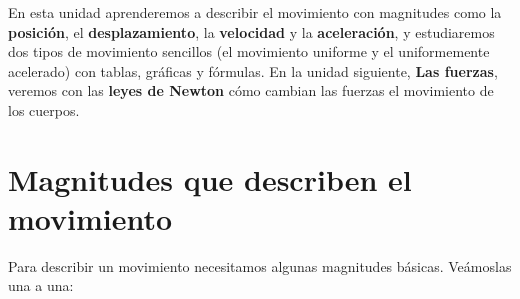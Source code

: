 En esta unidad aprenderemos a describir el movimiento con magnitudes como la \textbf{posición}, el \textbf{desplazamiento}, la \textbf{velocidad} y la \textbf{aceleración}, y estudiaremos dos tipos de movimiento sencillos (el movimiento uniforme y el uniformemente acelerado) con tablas, gráficas y fórmulas. En la unidad siguiente, \textbf{Las fuerzas}, veremos con las \textbf{leyes de Newton} cómo cambian las fuerzas el movimiento de los cuerpos.


\section{Magnitudes que describen el movimiento}

Para describir un movimiento necesitamos algunas magnitudes básicas. Veámoslas una a una:

